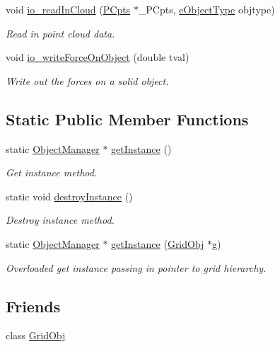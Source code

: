 \begin{DoxyCompactItemize}
void \hyperlink{class_object_manager_a5c11d747c3df9e91d5fc2dac836d7b7e}{io\+\_\+read\+In\+Cloud} (\hyperlink{class_p_cpts}{P\+Cpts} $\ast$\+\_\+\+P\+Cpts, \hyperlink{_object_manager_8h_a7b78fa3db30dfb9c1efc82bf886fe184}{e\+Object\+Type} objtype)
\begin{DoxyCompactList}\small\item\em Read in point cloud data. \end{DoxyCompactList}\item 
void \hyperlink{class_object_manager_adf65260d81584613fa33f2e7658f1b36}{io\+\_\+write\+Force\+On\+Object} (double tval)
\begin{DoxyCompactList}\small\item\em Write out the forces on a solid object. \end{DoxyCompactList}\end{DoxyCompactItemize}
\subsection*{Static Public Member Functions}
\begin{DoxyCompactItemize}
\item 
static \hyperlink{class_object_manager}{Object\+Manager} $\ast$ \hyperlink{class_object_manager_acf7a2f12f034c76d9e3a5aa5837dddb5}{get\+Instance} ()
\begin{DoxyCompactList}\small\item\em Get instance method. \end{DoxyCompactList}\item 
static void \hyperlink{class_object_manager_a5945decc43eb5fdeaaad101fa7aa282f}{destroy\+Instance} ()
\begin{DoxyCompactList}\small\item\em Destroy instance method. \end{DoxyCompactList}\item 
static \hyperlink{class_object_manager}{Object\+Manager} $\ast$ \hyperlink{class_object_manager_a3c648f3d7388df47db0db9fcb4b8b618}{get\+Instance} (\hyperlink{class_grid_obj}{Grid\+Obj} $\ast$g)
\begin{DoxyCompactList}\small\item\em Overloaded get instance passing in pointer to grid hierarchy. \end{DoxyCompactList}\end{DoxyCompactItemize}
\subsection*{Friends}
\begin{DoxyCompactItemize}
\item 
class \hyperlink{class_object_manager_a55cfec1721fb1b9d9e7592bd6288c998}{Grid\+Obj}
\end{DoxyCompactItemize}


